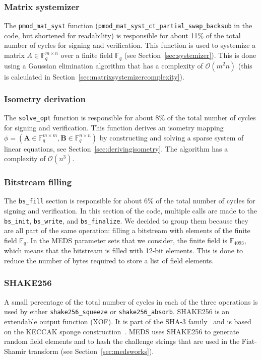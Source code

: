 \documentclass[11pt,a4paper]{report}
\theoremstyle{definition}
\begin{document}
\subsubsection{Matrix systemizer}
The \texttt{pmod\_mat\_syst} function (\texttt{pmod\_mat\_syst\_ct\_partial\_swap\_backsub} in the code, but shortened for readability) is responsible for about 11\% of the total number of cycles for signing and verification. This function is used to systemize a matrix $A \in \mathbb{F}_q^{m \times n}$ over a finite field $\mathbb{F}_q$ (see Section~\ref{sec:systemizer}). This is done using a Gaussian elimination algorithm that has a complexity of $\mathcal{O}(m^2n)$ (this is calculated in Section~\ref{sec:matrixsystemizercomplexity}).

\subsubsection{Isometry derivation}
The \texttt{solve\_opt} function is responsible for about 8\% of the total number of cycles for signing and verification. This function derives an isometry mapping $\phi = (\textbf{A} \in \mathbb{F}_q^{m \times m}, \textbf{B} \in \mathbb{F}_q^{n \times n})$ by constructing and solving a sparse system of linear equations, see Section~\ref{sec:derivingisometry}. The algorithm has a complexity of $\mathcal{O}(n^3)$.

\subsubsection{Bitstream filling}
The \texttt{bs\_fill} section is responsible for about 6\% of the total number of cycles for signing and verification. In this section of the code, multiple calls are made to the \texttt{bs\_init}, \texttt{bs\_write}, and \texttt{bs\_finalize}. We decided to group them because they are all part of the same operation: filling a bitstream with elements of the finite field $\mathbb{F}_q$. In the MEDS parameter sets that we consider, the finite field is $\mathbb{F}_{4093}$, which means that the bitstream is filled with 12-bit elements. This is done to reduce the number of bytes required to store a list of field elements.

\subsubsection{SHAKE256}
\label{sec:shake256}
A small percentage of the total number of cycles in each of the three operations is used by either \texttt{shake256\_squeeze} or \texttt{shake256\_absorb}. SHAKE256 is an extendable output function (XOF). It is part of the SHA-3 family~\cite{dworkin2015sha} and is based on the KECCAK sponge construction~\cite{bertoni2013keccak}. MEDS uses SHAKE256 to generate random field elements and to hash the challenge strings that are used in the Fiat-Shamir transform (see Section~\ref{sec:medsworks}).
\end{document}
